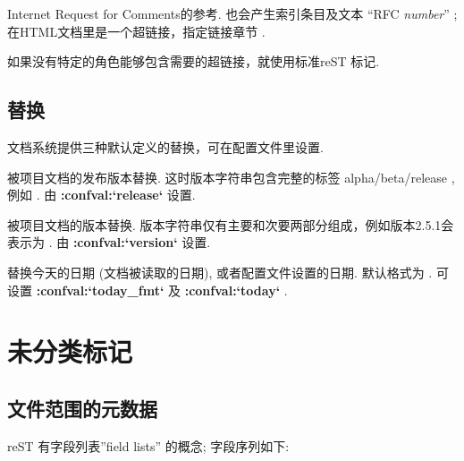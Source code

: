 \documentclass[letterpaper,10pt,english]{sphinxmanual}
\begin{document}

\begin{fulllineitems}
\label{markup/inline:role-rfc}
Internet Request for Comments的参考.  也会产生索引条目及文本 ``RFC \emph{number}'' ;
在HTML文档里是一个超链接，指定链接章节 .

\end{fulllineitems}


如果没有特定的角色能够包含需要的超链接，就使用标准reST 标记.


\subsection{替换}
\label{markup/inline:default-substitutions}\label{markup/inline:id13}
文档系统提供三种默认定义的替换，可在配置文件里设置.


\begin{fulllineitems}
被项目文档的发布版本替换.  这时版本字符串包含完整的标签 alpha/beta/release ,例如 .  由 {\color{red}\bfseries{}:confval:{}`release{}`} 设置.

\end{fulllineitems}



\begin{fulllineitems}
被项目文档的版本替换. 版本字符串仅有主要和次要两部分组成，例如版本2.5.1会表示为 .  由 {\color{red}\bfseries{}:confval:{}`version{}`} 设置.

\end{fulllineitems}



\begin{fulllineitems}
替换今天的日期 (文档被读取的日期), 或者配置文件设置的日期.  默认格式为 .  可设置 {\color{red}\bfseries{}:confval:{}`today\_fmt{}`} 及 {\color{red}\bfseries{}:confval:{}`today{}`} .

\end{fulllineitems}



\section{未分类标记}
\label{markup/misc:id1}\label{markup/misc::doc}

\subsection{文件范围的元数据}
\label{markup/misc:metadata}\label{markup/misc:id2}
reST 有字段列表''field lists'' 的概念; 字段序列如下:
\end{document}
